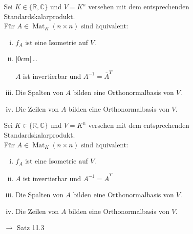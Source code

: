 \documentclass[11pt]{article}
\renewcommand{\cite}[1]{\par\bigskip\hfill{\color{gray}\tiny\(\to\) #1}}
\newcommand{\CC}{\mathbb{C}}
\newcommand{\RR}{\mathbb{R}}
\DeclareMathOperator{\Mat}{Mat}
\newcommand{\hide}[1]{\parbox{0cm}{\raisebox{-7pt}[0cm]{\dots}}\color{white}#1\color{black}}
\let\olddots\dots
\renewcommand{\dots}{\,\olddots\,}
\newenvironment{field}{}{\newpage}
\newif\ifnote
\newenvironment{note}{\notetrue}{\notefalse}
\begin{document}
\begin{note}
    \begin{field}%
        Sei \(K\in\{\RR,\CC\}\) und \(V=K^n\) versehen mit dem entsprechenden Standardskalarprodukt.\\
        Für \(A\in \Mat_K(n\times n)\) sind äquivalent:
        \begin{enumerate}[(i)]
            \item \(f_A\) ist eine Isometrie auf \(V\).
            \item \hide{\(A\) ist invertierbar und \(A^{-1}=\overline{A}^T\)}
            \item Die Spalten von \(A\) bilden eine Orthonormalbasis von \(V\).
            \item Die Zeilen von \(A\) bilden eine Orthonormalbasis von \(V\).
        \end{enumerate}
    \end{field}
    \begin{field}
        Sei \(K\in\{\RR,\CC\}\) und \(V=K^n\) versehen mit dem entsprechenden Standardskalarprodukt.\\
        Für \(A\in \Mat_K(n\times n)\) sind äquivalent:
        \begin{enumerate}[(i)]
            \item \(f_A\) ist eine Isometrie auf \(V\).
            \item \(A\) ist invertierbar und \(A^{-1}=\overline{A}^T\)
            \item Die Spalten von \(A\) bilden eine Orthonormalbasis von \(V\).
            \item Die Zeilen von \(A\) bilden eine Orthonormalbasis von \(V\).
        \end{enumerate}
        \cite{Satz 11.3}
    \end{field}


\end{note}
\end{document}

